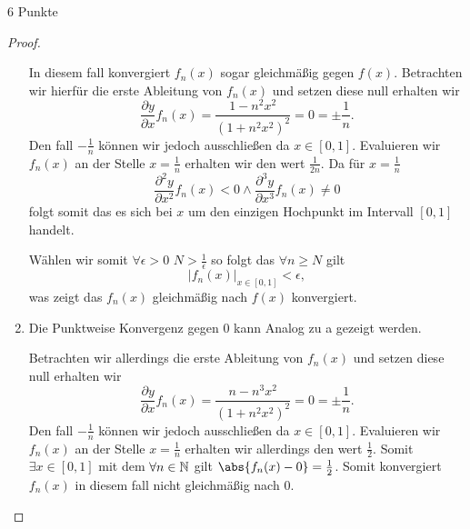 \documentclass{problemset}
\begin{document}
\begin{problem}{6 Punkte}
\begin{proof}
\begin{enumerate}
              In diesem fall konvergiert \(f_n(x)\) sogar gleichmäßig gegen
              \(f(x)\). Betrachten wir hierfür die erste Ableitung von
              \(f_n(x)\) und setzen diese null erhalten wir \[
                  \frac{\partial y}{\partial x} f_n(x) = \frac{1 - n^2 x^2}{{(1 + n^2 x^2)}^2} = 0 = \pm \frac{1}{n}.
              \]
              Den fall \(-\frac{1}{n}\) können wir jedoch ausschließen da \(x
              \in \left[0,1\right]\). Evaluieren wir \(f_n(x)\) an der Stelle
              \(x = \frac{1}{n}\) erhalten wir den wert \(\frac{1}{2n}\). Da
              für \(x = \frac{1}{n}\) \[
                  \frac{\partial^2 y}{\partial x^2} f_n(x) < 0 \land \frac{\partial^3 y}{\partial x^3} f_n(x) \neq 0
              \] folgt somit das es sich bei \(x\) um den einzigen Hochpunkt im
                 Intervall \(\left[0, 1\right]\) handelt.

              Wählen wir somit \(\forall \epsilon > 0\) \(N >
              \frac{1}{\epsilon}\) so folgt das \(\forall n \ge N\) gilt \[
                  \left| f_n(x) \right|_{x \in [0,1]} < \epsilon,
              \] was zeigt das \(f_n(x)\) gleichmäßig nach \(f(x)\)
                 konvergiert.

        \item Die Punktweise Konvergenz gegen \(0\) kann Analog zu a gezeigt
              werden.

              Betrachten wir allerdings die erste Ableitung von \(f_n(x)\) und
              setzen diese null erhalten wir \[
                  \frac{\partial y}{\partial x} f_n(x) = \frac{n - n^3 x^2}{{(1 + n^2 x^2)}^2} = 0 = \pm \frac{1}{n}.
              \]
              Den fall \(-\frac{1}{n}\) können wir jedoch ausschließen da \(x
              \in \left[0,1\right]\). Evaluieren wir \(f_n(x)\) an der Stelle
              \(x = \frac{1}{n}\) erhalten wir allerdings den wert
              \(\frac{1}{2}\). Somit \(\exists x \in [0,1]\) mit dem \(\forall
              n \in \mathbb{N}\) gilt \(\abs{f_n(x) - 0} = \frac{1}{2}\). Somit
              konvergiert \(f_n(x)\) in diesem fall nicht gleichmäßig nach
              \(0\).
    \end{enumerate}
\end{proof}
\end{problem}
\end{document}
